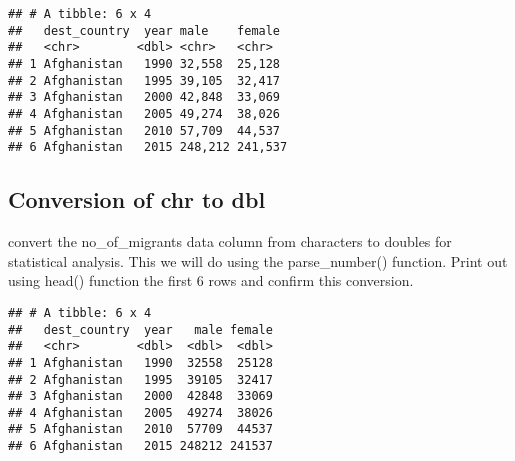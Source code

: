 \documentclass[]{article}
\newenvironment{Shaded}{\begin{snugshade}}{\end{snugshade}}
\newcommand{\KeywordTok}[1]{\textcolor[rgb]{0.13,0.29,0.53}{\textbf{#1}}}
\newcommand{\StringTok}[1]{\textcolor[rgb]{0.31,0.60,0.02}{#1}}
\newcommand{\OperatorTok}[1]{\textcolor[rgb]{0.81,0.36,0.00}{\textbf{#1}}}
\newcommand{\NormalTok}[1]{#1}
\begin{document}
\begin{verbatim}
## # A tibble: 6 x 4
##   dest_country  year male    female 
##   <chr>        <dbl> <chr>   <chr>  
## 1 Afghanistan   1990 32,558  25,128 
## 2 Afghanistan   1995 39,105  32,417 
## 3 Afghanistan   2000 42,848  33,069 
## 4 Afghanistan   2005 49,274  38,026 
## 5 Afghanistan   2010 57,709  44,537 
## 6 Afghanistan   2015 248,212 241,537
\end{verbatim}

\subsection{Conversion of chr to dbl}\label{conversion-of-chr-to-dbl}

convert the no\_of\_migrants data column from characters to doubles for
statistical analysis. This we will do using the parse\_number()
function. Print out using head() function the first 6 rows and confirm
this conversion.

\begin{Shaded}
\end{Shaded}

\begin{verbatim}
## # A tibble: 6 x 4
##   dest_country  year   male female
##   <chr>        <dbl>  <dbl>  <dbl>
## 1 Afghanistan   1990  32558  25128
## 2 Afghanistan   1995  39105  32417
## 3 Afghanistan   2000  42848  33069
## 4 Afghanistan   2005  49274  38026
## 5 Afghanistan   2010  57709  44537
## 6 Afghanistan   2015 248212 241537
\end{verbatim}
\end{document}
